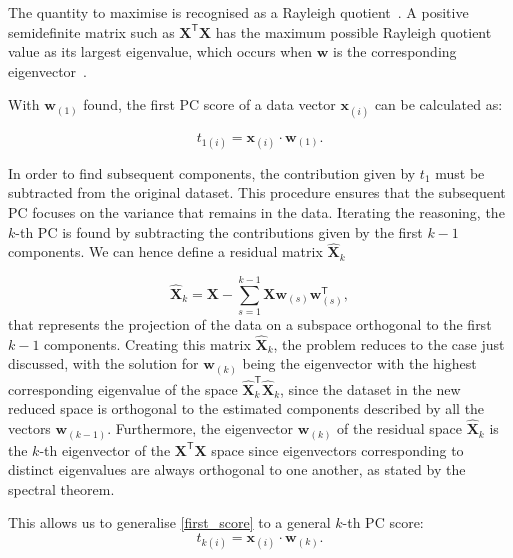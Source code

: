 The quantity to maximise is recognised as a Rayleigh quotient~\cite{horn13}. A positive semidefinite matrix such as $\mathbf{X}^{\mathsf{T}} \mathbf{X}$ has the maximum possible Rayleigh quotient value as its largest eigenvalue, which occurs when $\mathbf{w}$ is the corresponding eigenvector~\cite{parlett1998symmetric}.


With $\mathbf{w}_{(1)}$ found, the first PC score of a data vector $\mathbf{x}_{(i)}$ can be calculated as:

\begin{equation}
t_{1(i)} = \mathbf{x}_{(i)} \cdot \mathbf{w}_{(1)}.\label{first_score}
\end{equation}

In order to find subsequent components, the contribution given by $t_{1}$ must be subtracted from the original dataset. This procedure ensures that the subsequent PC focuses on the variance that remains in the data. Iterating the reasoning, the $k$-th PC is found by subtracting the contributions given by the first $k-1$ components. We can hence define a residual matrix $\mathbf{\hat{X}}_{k}$

\begin{equation}
\mathbf{\hat{X}}_{k} = \mathbf{X} - \sum_{s=1}^{k-1} \mathbf{X} \mathbf{w}_{(s)} \mathbf{w}_{(s)}^{\mathsf{T}},\label{dim_red_tran}
\end{equation}
that represents the projection of the data on a subspace orthogonal to the first $k-1$ components.
Creating this matrix $\mathbf{\hat{X}}_{k}$, the problem reduces to the case just discussed, with the solution for $\mathbf{w}_{(k)}$ being the eigenvector with the highest corresponding eigenvalue of the space $\mathbf{\hat{X}}_{k}^\mathsf{T}\mathbf{\hat{X}}_{k}$, since the dataset in the new reduced space is orthogonal to the estimated components described by all the vectors $\mathbf{w}_{(k-1)}$. Furthermore, the eigenvector $\mathbf{w}_{(k)}$ of the residual space $\mathbf{\hat{X}}_{k}$ is the $k$-th  eigenvector of the $\mathbf{X}^{\mathsf{T}} \mathbf{X}$ space since eigenvectors corresponding to distinct eigenvalues are always orthogonal to one another, as stated by the spectral theorem.

This allows us to generalise \eqref{first_score} to a general $k$-th PC score:
\begin{equation}
t_{k(i)} = \mathbf{x}_{(i)} \cdot \mathbf{w}_{(k)}.\label{score}
\end{equation}





